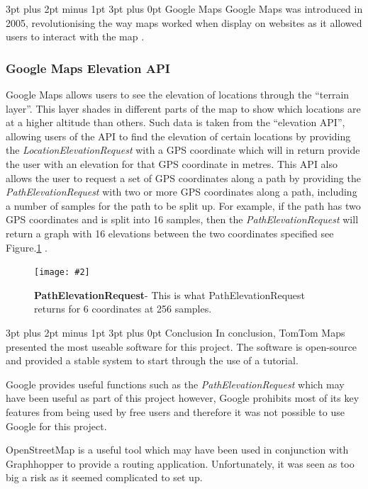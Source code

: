 \documentclass[12pt,a4paper]{article}
\makeatletter
\newcommand{\figuremacro}[5]{
    \begin{figure}[#1]
        \centering
        \texttt{[image: \#2]}
        \caption[#3]{\textbf{#3}#4}
        \label{fig:#2}
    \end{figure}
}
\renewcommand\subsection{\@startsection {subsection}{1}{0mm} %
                               {3pt plus 2pt minus 1pt} %
                               {3pt plus 0pt} %
                               {\normalfont\bfseries}}
\makeatother
\begin{document}
\subsection{Google Maps}
Google Maps was introduced in 2005, revolutionising the way maps worked when display on websites as it allowed users to interact with the map \cite{Svennerberg2010}.

\subsubsection{Google Maps Elevation API}
Google Maps allows users to see the elevation of locations through the \enquote{terrain layer}. This layer shades in different parts of the map to show which locations are at a higher altitude than others. Such data is taken from the \enquote{elevation API}, allowing users of the API to find the elevation of certain locations by providing the \textit{LocationElevationRequest} with a GPS coordinate which will in return provide the user with an elevation for that GPS coordinate in metres. This API also allows the user to request a set of GPS coordinates along a path by providing the \textit{PathElevationRequest} with two or more GPS coordinates along a path, including a number of samples for the path to be split up. For example, if the path has two GPS coordinates and is split into 16 samples, then the \textit{PathElevationRequest} will return a graph with 16 elevations between the two coordinates specified see Figure.\ref{fig:googleElevationPath} \cite{googleElevation}.

\figuremacro{h}{googleElevationPath}{PathElevationRequest}{- This is what PathElevationRequest returns for 6 coordinates at 256 samples.}{0.85} 


\subsection{Conclusion}
In conclusion, TomTom Maps presented the most useable software for this project. The software is open-source and provided a stable system to start through the use of a tutorial. 

Google provides useful functions such as the \textit{PathElevationRequest} which may have been useful as part of this project however, Google prohibits most of its key features from being used by free users and therefore it was not possible to use Google for this project.

OpenStreetMap is a useful tool which may have been used in conjunction with Graphhopper to provide a routing application. Unfortunately, it was seen as too big a risk as it seemed complicated to set up.
\end{document}
